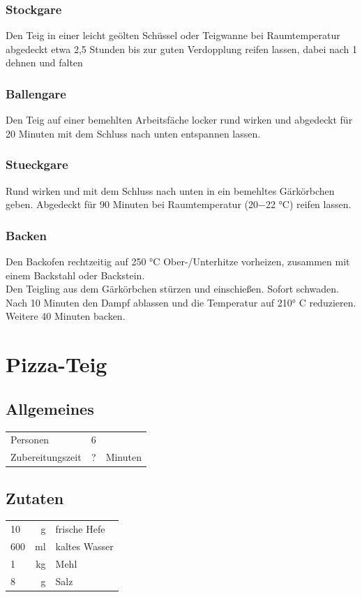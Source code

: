 \documentclass[10pt,a4paper,ngerman, DIV=16]{scrartcl}
\begin{document}
\subsubsection*{\Gls{Stockgare}}
Den Teig in einer leicht geölten Schüssel oder Teigwanne bei Raumtemperatur abgedeckt etwa 2,5 Stunden bis zur guten Verdopplung reifen lassen, dabei nach 1 dehnen und falten

\subsubsection*{\Gls{Ballengare}}
Den Teig auf einer bemehlten Arbeitsfäche locker rund wirken und abgedeckt für 20 Minuten mit dem Schluss nach unten entspannen lassen. 

\subsubsection*{\Gls{Stueckgare}}
Rund wirken und mit dem Schluss nach unten in ein bemehltes Gärkörbchen geben. Abgedeckt für 90 Minuten bei Raumtemperatur (20−22 °C) reifen lassen. 

\subsubsection*{Backen}
Den Backofen rechtzeitig auf 250 °C Ober-/Unterhitze  vorheizen, zusammen mit einem Backstahl oder Backstein.\\
Den Teigling aus dem Gärkörbchen stürzen und einschießen. Sofort schwaden. \\
Nach 10 Minuten den Dampf ablassen und die Temperatur auf 210° C reduzieren. Weitere 40 Minuten backen.


\section{Pizza-Teig}\label{sec:Pizza-Teig}

\subsection*{Allgemeines}
\begin{tabular}{lrl}
    Personen         &  6  &  \\
    Zubereitungszeit &  ? & Minuten \\
\end{tabular} 

\subsection*{Zutaten}
\begin{tabular}{lrl}
    10 &  g & frische Hefe \\
    600   & ml   & kaltes Wasser             \\
    1   & kg   & Mehl              \\
    8   & g & Salz           \\
\end{tabular} 
\end{document}
